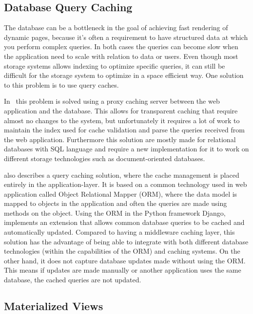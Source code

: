 
\subsection{Database Query Caching}

The database can be a bottleneck in the goal of achieving fast rendering of dynamic pages, because it’s often a requirement to have structured data at which you perform complex queries. In both cases the queries can become slow when the application need to scale with relation to data or users. Even though most storage systems allows indexing to optimize specific queries, it can still be difficult for the storage system to optimize in a space efficient way. One solution to this problem is to use query caches.

In~\cite{paper:transparent-caching, paper:cosar} this problem is solved using a proxy caching server between the web application and the database. This allows for transparent caching that require almost no changes to the system, but unfortunately it requires a lot of work to maintain the index used for cache validation and parse the queries received from the web application. Furthermore this solution are mostly made for relational databases with SQL language and require a new implementation for it to work on different storage technologies such as document-oriented databases.

\cite{paper:cache-genie} also describes a query caching solution, where the cache management is placed entirely in the application-layer. It is based on a common technology used in web application called Object Relational Mapper (ORM), where the data model is mapped to objects in the application and often the queries are made using methods on the object. Using the ORM in the Python framework Django, \cite{paper:cache-genie} implements an extension that allows common database queries to be cached and automatically updated. Compared to having a middleware caching layer, this solution has the advantage of being able to integrate with both different database technologies (within the capabilities of the ORM) and caching systems. On the other hand, it does not capture database updates made without using the ORM. This means if updates are made manually or another application uses the same database, the cached queries are not updated.

\subsection{Materialized Views}

